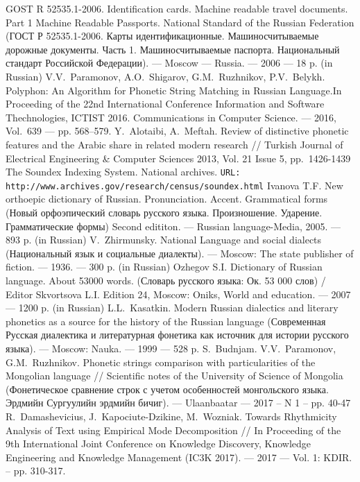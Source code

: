 \documentclass[conference,a4paper]{IEEEtran}
\providecommand\url[1]{\texttt{#1}}
\begin{document}
\begin{thebibliography}{11}
 GOST R 52535.1-2006. Identification cards. Machine readable travel documents. Part 1 Machine Readable Passports. National Standard of the Russian Federation (ГОСТ Р 52535.1-2006. Карты идентификационные. Машиносчитываемые дорожные документы. Часть 1. Машиносчитываемые паспорта. Национальный стандарт Российской Федерации). --- Moscow --- Russia. --- 2006 --- 18 p. (in Russian)
 V.V.~Paramonov, A.O.~Shigarov, G.M.~Ruzhnikov, P.V.~Belykh. Polyphon: An Algorithm for Phonetic String Matching in Russian Language.In Proceeding of the 22nd International Conference Information and Software Thechnologies, ICTIST 2016. Communications in Computer Science. --- 2016, Vol.~639 --- pp. 568--579.
 Y.~Alotaibi, A.~Meftah. Review of distinctive phonetic features and the Arabic share in related modern research // Turkish Journal of Electrical Engineering \& Computer Sciences 2013, Vol. 21 Issue 5, pp.~1426-1439
	The Soundex Indexing System. National archives. \texttt{URL:} \url{http://www.archives.gov/research/census/soundex.html}
 Ivanova T.F. New orthoepic dictionary of Russian. Pronunciation. Accent. Grammatical forms (Новый орфоэпический словарь русского языка. Произношение. Ударение. Грамматические формы) Second edititon. –-- Russian language-Media, 2005. --– 893 p. (in Russian)
 V.~Zhirmunsky. National Language and social dialects (Национальный язык и социальные диалекты). --- Moscow: The state publisher of fiction. --- 1936. --- 300 p. (in Russian)
 Ozhegov S.I. Dictionary of Russian language. About 53000 words. (Словарь русского языка: Ок. 53 000 слов) / Editor Skvortsova L.I. Edition 24, Moscow: Oniks, World and education. --- 2007 --- 1200 p. (in Russian)
 L.L.~Kasatkin. Modern Russian dialectics and literary phonetics as a source for the history of the Russian language (Современная Русская диалектика и литературная фонетика как источник для истории русского языка). --- Moscow: Nauka. --- 1999 --- 528 p.
 S.~Budnjam. V.V.~Paramonov, G.M.~Ruzhnikov. Phonetic strings comparison with particularities of the Mongolian language // Scientific notes of the University of Science of Mongolia (Фонетическое сравнение строк с учетом особенностей монгольского языка. Эрдмийн Сургуулийн эрдмийн бичиг). --- Ulaanbaatar --- 2017 -- N 1 -- pp. 40-47
 R.~Damashevicius, J.~Kapociute-Dzikine, M.~Wozniak. Towards Rhythmicity Analysis of Text using Empirical Mode Decomposition // In Proceeding of the 9th International Joint Conference on Knowledge Discovery, Knowledge Engineering and Knowledge Management (IC3K 2017). --- 2017 --- Vol. 1: KDIR. -- pp. 310-317. 
\end{thebibliography}




\end{document}
